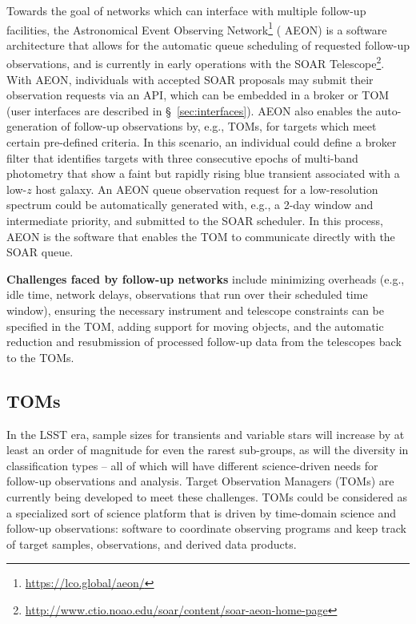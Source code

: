 Towards the goal of networks which can interface with multiple follow-up facilities, the Astronomical Event Observing Network\footnote{\url{https://lco.global/aeon/}} ( {AEON}) is a software architecture that allows for the automatic queue scheduling of requested follow-up observations, and is currently in early operations with the  {SOAR} Telescope\footnote{\url{http://www.ctio.noao.edu/soar/content/soar-aeon-home-page}}.
With  {AEON}, individuals with accepted  {SOAR} proposals may submit their observation requests via an  {API}, which can be embedded in a broker or  {TOM} (user interfaces are described in \S~\ref{sec:interfaces}).
AEON also enables the auto-generation of follow-up observations by, e.g., TOMs, for targets which meet certain pre-defined criteria.
In this scenario, an individual could define a broker filter that identifies targets with three consecutive epochs of multi-band photometry that show a faint but rapidly rising blue  {transient} associated with a low-$z$ host galaxy.
An  {AEON} queue observation request for a low-resolution spectrum could be automatically generated with, e.g., a 2-day window and intermediate priority, and submitted to the  {SOAR} scheduler.
In this process,  {AEON} is the software that enables the  {TOM} to communicate directly with the  {SOAR} queue.

{\bf Challenges faced by follow-up networks} include minimizing overheads (e.g., idle time, network delays, observations that run over their scheduled time window), ensuring the necessary instrument and telescope constraints can be specified in the  {TOM}, adding support for moving objects, and the automatic reduction and resubmission of processed follow-up data from the telescopes back to the TOMs. 

\subsection{TOMs}\label{sec:followup_toms}

In the  {LSST} era, sample sizes for transients and variable stars will increase by at least an order of magnitude for even the rarest sub-groups, as will the diversity in classification types -- all of which will have different science-driven needs for follow-up observations and analysis.
Target Observation Managers (TOMs) are currently being developed to meet these challenges.
TOMs could be considered as a specialized sort of science platform that is driven by time-domain science and follow-up observations: software to coordinate observing programs and keep track of target samples, observations, and derived data products. 

